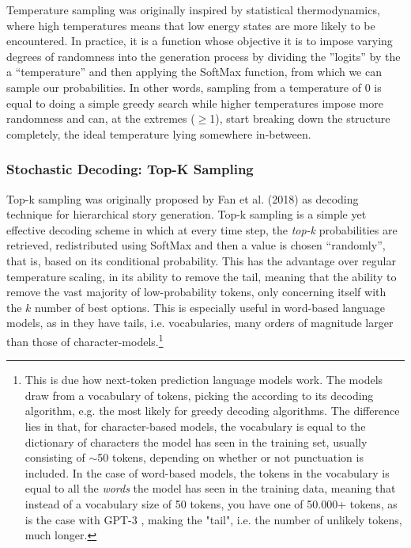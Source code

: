Temperature sampling was originally inspired by statistical thermodynamics, where high temperatures means that low energy states are more likely to be encountered. In practice, it is a function whose objective it is to impose varying degrees of randomness into the generation process by dividing the ”logits” by the a “temperature” and then applying the SoftMax function, from which we can sample our probabilities. In other words, sampling from a temperature of 0 is equal to doing a simple greedy search while higher temperatures impose more randomness and can, at the extremes ($\geq$1), start breaking down the structure completely, the ideal temperature lying somewhere in-between.

\subsubsection{Stochastic Decoding: Top-K Sampling}
\label{sec:sto-top-k}

Top-k sampling was originally proposed by Fan et al. (2018) \cite{FanAngela2018HNSG} as decoding technique for hierarchical story generation. Top-k sampling is a simple yet effective decoding scheme in which at every time step, the \textit{top-k} probabilities are retrieved, redistributed using SoftMax and then a value is chosen “randomly”, that is, based on its conditional probability. This has the advantage over regular temperature scaling, in its ability to remove the tail, meaning that the ability to remove the vast majority of low-probability tokens, only concerning itself with the $k$ number of best options. This is especially useful in word-based language models, as in they have tails, i.e. vocabularies, many orders of magnitude larger than those of character-models.\footnote{This is due how next-token prediction language models work. The models draw from a vocabulary of tokens, picking the according to its decoding algorithm, e.g. the most likely for greedy decoding algorithms. The difference lies in that, for character-based models, the vocabulary is equal to the dictionary of characters the model has seen in the training set, usually consisting of $\sim$50 tokens, depending on whether or not punctuation is included. In the case of word-based models, the tokens in the vocabulary is equal to all the \textit{words} the model has seen in the training data, meaning that instead of a vocabulary size of 50 tokens, you have one of 50.000+ tokens, as is the case with GPT-3 \cite{BrownTomB2020LMaF}, making the "tail", i.e. the number of unlikely tokens, much longer.}

